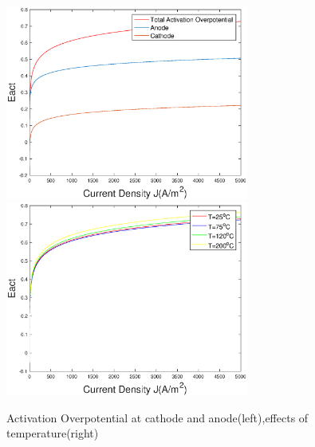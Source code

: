 \begin{figure}[h] 
\includegraphics[width=8cm] {Activation.eps} 
\includegraphics[width=8cm]{ActivationT.eps}
\caption{Activation Overpotential at cathode and anode(left),effects of temperature(right)} 
\end{figure} 


